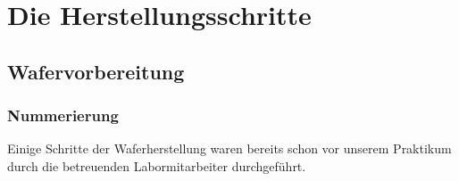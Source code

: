 \newcommand{\institut}{}
\newcommand{\fachgebiet}{Halbleiterbauelemente}
\newcommand{\veranstaltung}{Praktikum Technologie und Bauelemente der Halbleitertechnik}
\newcommand{\pdfautor}{Thomas Kapa (325319), Alona Siebert (303843), Özgü Dogan (326048), Dirk Babendererde (321836)}
\newcommand{\autor}{Thomas Kapa (325 319)\\ Alona Siebert (303 843)\\ \"Ozg\"u Dogan (326 048)\\ Dirk Babendererde (321 836)}
\newcommand{\pdftitle}{Praktikum\ Technologie und Bauelemente der Halbleitertechnik}
\newcommand{\prototitle}{Praktikum Technologie und Bauelemente der Halbleitertechnik}
\newcommand{\aufgabe}{}

\newcommand{\gruppe}{Gruppe 1}
\newcommand{\betreuer}{Betreuer:\\ Clemens Helfmeier\\ Philipp Scholz}





\setcaptionwidth{7.5cm}




% 

\sloppy




\section[Die Herstellungsschritte]{Die Herstellungsschritte}
\subsection[Wafervorbereitung]{Wafervorbereitung}
\subsubsection[Nummerierung]{Nummerierung}

Einige Schritte der Waferherstellung waren bereits schon vor unserem Praktikum durch die betreuenden Labormitarbeiter durchgeführt.

